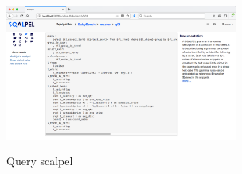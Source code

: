 \documentclass{cidr-2019}
\begin{document}









\begin{figure}[t!]
  \centering
  \includegraphics[height=2in,width=3in]{Figures/scalpel2.png}
  \caption{Query scalpel
    \label{fig:scalpel}}
\end{figure}
\end{document}
